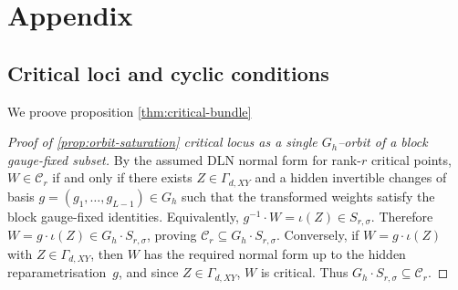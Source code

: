 \documentclass{article}
\theoremstyle{definition}
\begin{document}
\section*{Appendix}
\subsection*{Critical loci and cyclic conditions}\label{app:loci-cyclic} We proove proposition \ref{thm:critical-bundle}
\begin{proof}[Proof of \ref{prop:orbit-saturation} critical locus as a single $G_h$--orbit of a block gauge-fixed subset]\label{proof:orbit-saturation}
    By the assumed DLN normal form for rank-$r$ critical points, $W \in \mathcal{C}_r$ if and only if there exists $Z \in \Gamma_{d,XY}$ and a hidden invertible changes of basis $g = (g_1, \dots, g_{L-1}) \in G_h$ such that the transformed weights satisfy the block gauge-fixed identities.  Equivalently, $g^{-1} \cdot W = \iota(Z) \in S_{r,\sigma}$.  Therefore $W = g \cdot \iota(Z) \in G_h \cdot S_{r,\sigma}$, proving $\mathcal{C}_r \subseteq G_h \cdot S_{r,\sigma}$.  Conversely, if $W = g \cdot \iota(Z)$ with $Z \in \Gamma_{d,XY}$, then $W$ has the required normal form up to the hidden reparametrisation~$g$, and since $Z\in \Gamma_{d,XY}$, $W$ is critical.  Thus $G_h \cdot S_{r,\sigma} \subseteq \mathcal{C}_r$.
\end{proof}
\end{document}
